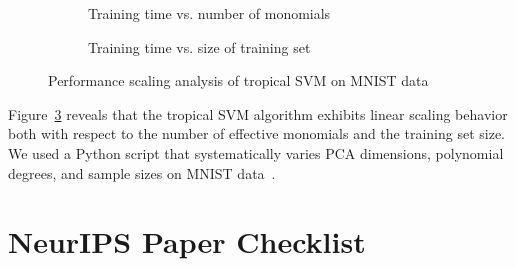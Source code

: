 \documentclass{article}
\begin{document}
\begin{figure}[htbp]
    \centering
    \begin{subfigure}{0.48\textwidth}
        \centering
        \resizebox{0.95\textwidth}{!}{}
        \caption{Training time vs. number of monomials}
        \label{fig:pca_degree_scaling}
    \end{subfigure}
    \hfill
    \begin{subfigure}{0.48\textwidth}
        \centering
        \resizebox{0.95\textwidth}{!}{}
        \caption{Training time vs. size of training set}
        \label{fig:sample_size_scaling}
    \end{subfigure}
    \caption{Performance scaling analysis of tropical SVM on MNIST data}
    \label{fig:scaling_analysis}
\end{figure}

Figure~\ref{fig:scaling_analysis} reveals that the tropical SVM algorithm exhibits linear scaling behavior both with respect to the number of effective monomials and the training set size. We used a Python script that systematically varies PCA dimensions, polynomial degrees, and sample sizes on MNIST data \cite{MNIST}.

\newpage
\section*{NeurIPS Paper Checklist}
\end{document}
